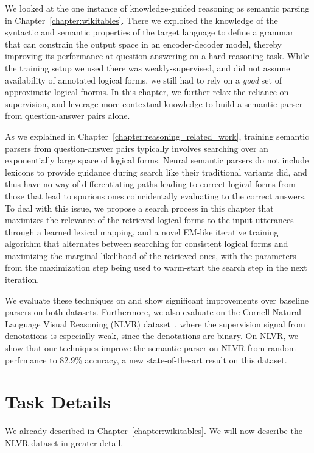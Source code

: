 We looked at the one instance of knowledge-guided reasoning as semantic parsing in
Chapter~\ref{chapter:wikitables}. There we exploited the knowledge of the syntactic
and semantic properties of the target language to define a grammar that can
constrain the output space in an encoder-decoder model, thereby improving its
performance at question-answering on a hard reasoning task. While the training setup we
used there was weakly-supervised, and did not assume availability of annotated
logical forms, we still had to rely on a \emph{good} set of approximate
logical fnorms. In this chapter, we further relax the reliance on supervision,
and leverage more contextual knowledge to build a semantic parser from
question-answer pairs alone.

As we explained in Chapter~\ref{chapter:reasoning_related_work},  training
semantic parsers from question-answer pairs typically involves
searching over an exponentially large space of logical forms. Neural semantic
parsers do not include lexicons to provide guidance during search like their
traditional variants did, and thus have no way of differentiating paths leading
to correct logical forms from those that lead to spurious ones coincidentally
evaluating to the correct answers. To deal with this issue, we propose a search
process in this chapter that maximizes the relevance of the retrieved logical forms to the input
utterances through a learned lexical mapping, and a novel EM-like iterative
training algorithm that alternates between searching for consistent logical
forms and maximizing the marginal likelihood of the retrieved ones, with the
parameters from the maximization step being used to warm-start the search step
in the next iteration.

We evaluate these techniques on \WTQ{} and show significant
improvements over baseline parsers on both datasets. Furthermore, we
also evaluate on the Cornell Natural Language Visual Reasoning (NLVR)
dataset~\citep{suhr2017corpus}, where the supervision signal from denotations
is especially weak, since the denotations are binary. On NLVR, we show that
our techniques improve the semantic parser on NLVR from random perfrmance to
82.9\% accuracy, a new state-of-the-art result on this dataset.

\section{Task Details} \label{sec:datasets}
We already described \WTQ{} in
Chapter~\ref{chapter:wikitables}.
We will now describe the NLVR dataset in greater detail.

